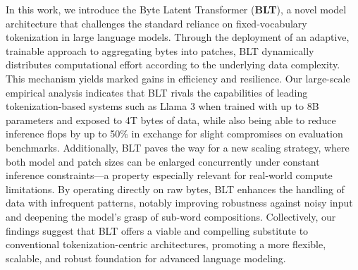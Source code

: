 In this work, we introduce the Byte Latent Transformer (\textbf{BLT}), a novel model architecture that challenges the standard reliance on fixed-vocabulary tokenization in large language models. Through the deployment of an adaptive, trainable approach to aggregating bytes into patches, {\textsc BLT} dynamically distributes computational effort according to the underlying data complexity. This mechanism yields marked gains in efficiency and resilience. Our large-scale empirical analysis indicates that {\textsc BLT} rivals the capabilities of leading tokenization-based systems such as Llama 3 when trained with up to 8B parameters and exposed to 4T bytes of data, while also being able to reduce inference flops by up to 50\% in exchange for slight compromises on evaluation benchmarks. Additionally, {\textsc BLT} paves the way for a new scaling strategy, where both model and patch sizes can be enlarged concurrently under constant inference constraints—a property especially relevant for real-world compute limitations. By operating directly on raw bytes, {\textsc BLT} enhances the handling of data with infrequent patterns, notably improving robustness against noisy input and deepening the model’s grasp of sub-word compositions. Collectively, our findings suggest that {\textsc BLT} offers a viable and compelling substitute to conventional tokenization-centric architectures, promoting a more flexible, scalable, and robust foundation for advanced language modeling.

